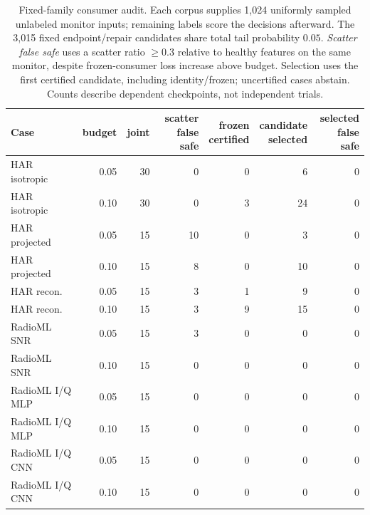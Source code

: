 \begin{table}[t]
\centering
\caption{Fixed-family consumer audit. Each corpus supplies 1,024 uniformly sampled unlabeled monitor inputs; remaining labels score the decisions afterward. The 3,015 fixed endpoint/repair candidates share total tail probability $0.05$. \emph{Scatter false safe} uses a scatter ratio $\ge0.3$ relative to healthy features on the same monitor, despite frozen-consumer loss increase above budget. Selection uses the first certified candidate, including identity/frozen; uncertified cases abstain. Counts describe dependent checkpoints, not independent trials.}
\label{tab:consumer_audit}
\footnotesize
\begin{tabular}{lrrrrrr}
\toprule
Case & budget & joint & \shortstack{scatter\\false safe} & \shortstack{frozen\\certified} & \shortstack{candidate\\selected} & \shortstack{selected\\false safe} \\
\midrule
HAR isotropic & 0.05 & 30 & 0 & 0 & 6 & 0 \\
HAR isotropic & 0.10 & 30 & 0 & 3 & 24 & 0 \\
HAR projected & 0.05 & 15 & 10 & 0 & 3 & 0 \\
HAR projected & 0.10 & 15 & 8 & 0 & 10 & 0 \\
HAR recon. & 0.05 & 15 & 3 & 1 & 9 & 0 \\
HAR recon. & 0.10 & 15 & 3 & 9 & 15 & 0 \\
RadioML SNR & 0.05 & 15 & 3 & 0 & 0 & 0 \\
RadioML SNR & 0.10 & 15 & 0 & 0 & 0 & 0 \\
RadioML I/Q MLP & 0.05 & 15 & 0 & 0 & 0 & 0 \\
RadioML I/Q MLP & 0.10 & 15 & 0 & 0 & 0 & 0 \\
RadioML I/Q CNN & 0.05 & 15 & 0 & 0 & 0 & 0 \\
RadioML I/Q CNN & 0.10 & 15 & 0 & 0 & 0 & 0 \\
\bottomrule
\end{tabular}
\end{table}
